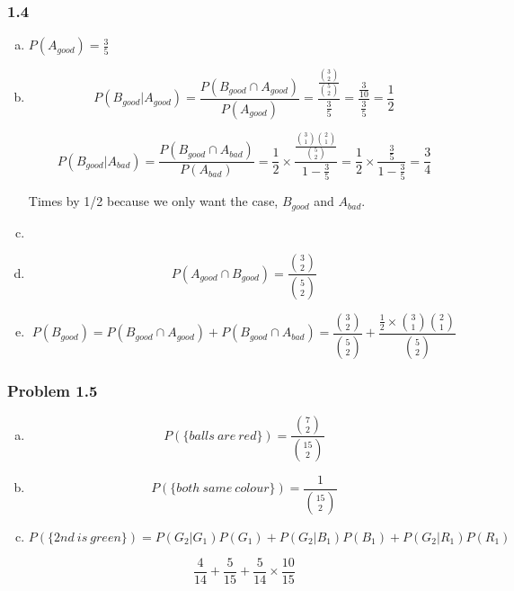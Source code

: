 \documentclass{report}
\begin{document}
\subsubsection*{1.4}

\begin{enumerate}[(a)]

\item $P(A_{good}) = \frac{3}{5}$

\item $$P(B_{good} | A_{good}) = \frac{P(B_{good} \cap A_{good})}{P(A_{good})} = \frac{\frac{{3 \choose 2}}{{5 \choose 2}}}{\frac{3}{5}} = \frac{\frac{3}{10}}{\frac{3}{5}} = \frac{1}{2}$$

$$P(B_{good} | A_{bad}) = \frac{P(B_{good} \cap A_{bad})}{P(A_{bad})} = \frac{1}{2} \times \frac{\frac{{3 \choose 1}{2 \choose 1}}{{5 \choose 2}}}{1 - \frac{3}{5}} = \frac{1}{2} \times \frac{\frac{3}{5}}{1 - \frac{3}{5}} = \frac{3}{4}$$

Times by 1/2 because we only want the case, $B_{good}$ and $A_{bad}$.

\item 

\item $$P(A_{good} \cap B_{good}) = \frac{{3 \choose 2}}{{5 \choose 2}}$$

\item $$P(B_{good}) = P(B_{good} \cap A_{good}) + P(B_{good} \cap A_{bad}) = \frac{{3 \choose 2}}{{5 \choose 2}} +  \frac{\frac{1}{2} \times {3 \choose 1}{2 \choose 1}}{{5 \choose 2}}$$

\end{enumerate}

\subsubsection*{Problem 1.5}

\begin{enumerate}[(a)]

\item $$P(\{ balls\ are\ red\}) = \frac{{7 \choose 2}}{{15 \choose 2}}$$

\item $$P(\{ both\ same\ colour\}) = \frac{1}{{15 \choose 2}}$$

\item $$P(\{ 2nd\ is\ green\})  = P(G_2 | G_1)P(G_1) + P(G_2|B_1)P(B_1) + P(G_2|R_1)P(R_1)$$

$$\frac{4}{14} + \frac{5}{15} + \frac{5}{14} \times \frac{10}{15}$$

\end{enumerate}
\end{document}
